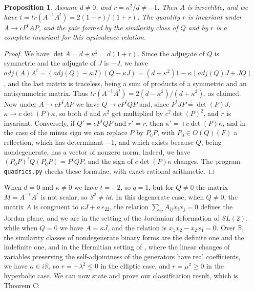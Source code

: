 \documentclass[11pt]{amsart}
\newtheorem{proposition}[theorem]{Proposition}
\theoremstyle{definition}
\begin{document}
\begin{proposition}
\label{p44}
Assume $d\neq0$, and $r=\kappa^2/d\neq-1$. Then $A$ is invertible, and we have $t=tr(A^{-1}A^t)=2(1-r)/(1+r)$. The quantity $r$ is invariant under $A\to cP^tAP$, and the pair formed by the similarity class of $Q$ and by $r$ is a complete invariant for this equivalence relation.
\end{proposition}

\begin{proof}
We have $\det A=d+\kappa^2=d(1+r)$. Since the adjugate of $Q$ is symmetric and the adjugate of $J$ is $-J$, we have $adj(A)A^t=(adj(Q)-\kappa J)(Q-\kappa J)=(d-\kappa^2)1-\kappa(adj(Q)J+JQ)$, and the last matrix is traceless, being a sum of products of a symmetric and an antisymmetric matrix. Thus $tr(A^{-1}A^t)=2(d-\kappa^2)/(d+\kappa^2)$, as claimed. Now under $A\to cP^tAP$ we have $Q\to cP^tQP$ and, since $P^tJP=\det(P)J$, $\kappa\to c\det(P)\kappa$, so both $d$ and $\kappa^2$ get multiplied by $c^2\det(P)^2$, and $r$ is invariant. Conversely, if $Q'=cP^tQP$ and $r'=r$, then $\kappa'=\pm c\det(P)\kappa$, and in the case of the minus sign we can replace $P$ by $P_0P$, with $P_0\in O(Q)(F)$ a reflection, which has determinant $-1$, and which exists because $Q$, being nondegenerate, has a vector of nonzero norm. Indeed, we have $(P_0P)^tQ(P_0P)=P^tQP$, and the sign of $c\det(P)\kappa$ changes. The program {\tt quadrics.py} checks these formulae, with exact rational arithmetic.
\end{proof}

When $d=0$ and $\kappa\neq0$ we have $t=-2$, so $q=1$, but for $Q\neq0$ the matrix $M=A^{-1}A^t$ is not scalar, so $S^2\neq id$. In this degenerate case, when $Q\neq0$, the matrix $A$ is congruent to $\kappa J+a\,e_{22}$, the relation $\sum_{ij}A_{ij}x_ix_j=0$ defines the Jordan plane, and we are in the setting of the Jordanian deformation of $SL(2)$, while when $Q=0$ we have $A=\kappa J$, and the relation is $x_1x_2-x_2x_1=0$. Over $\mathbb R$, the similarity classes of nondegenerate binary forms are the definite one and the indefinite one, and in the Hermitian setting of \cite{fba}, where the linear changes of variables preserving the self-adjointness of the generators have real coefficients, we have $\kappa\in i\mathbb R$, so $r=-\lambda^2\leq0$ in the elliptic case, and $r=\mu^2\geq0$ in the hyperbolic case. We can now state and prove our classification result, which is Theorem C:
\end{document}
